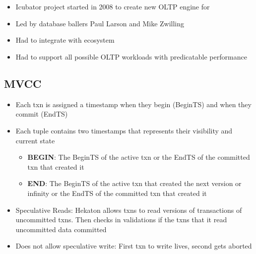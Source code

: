 \documentclass[11pt]{article}
\begin{document}
\maketitle
\thispagestyle{plain}

\section{}
\begin{itemize}
    \item Icubator project started in 2008 to create new OLTP engine for 
    \item Led by database ballers Paul Larson and Mike Zwilling
    \item Had to integrate with  ecosystem
    \item Had to support all possible OLTP workloads with predicatable performance
\end{itemize}
    \subsection*{ MVCC~\cite{p298-larson}}
    \begin{itemize}
        \item Each txn is assigned a timestamp when they begin (BeginTS) and when they commit (EndTS)
        \item Each tuple contains two timestamps that represents their visibility and current state
        \begin{itemize}
            \item \textbf{BEGIN}: The BeginTS of the active txn or the EndTS of the committed txn that created it
            \item \textbf{END}: The BeginTS of the active txn that created the next version or infinity or the EndTS of the committed txn that created it

        \end{itemize}
        \item Speculative Reads: Hekaton allows txns to read versions of transactions of uncommitted txns. Then checks in validations if the txns that it read uncommitted data committed
        \item Does not allow speculative write: First txn to write lives, second gets aborted
    \end{itemize}
\end{document}
